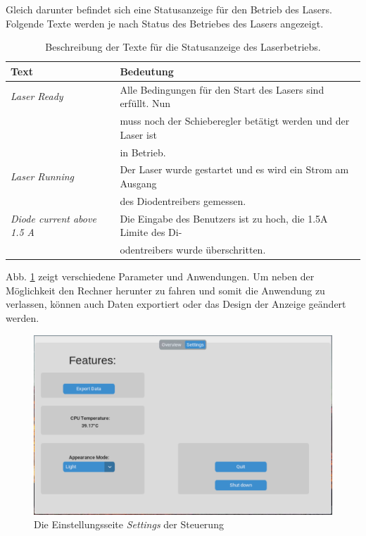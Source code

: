 Gleich darunter befindet sich eine Statusanzeige für den Betrieb des Lasers. Folgende Texte werden je nach Status des Betriebes des Lasers angezeigt.

\begin{table}[H]
    \centering
    \begin{tabular}{l|l}
        \textbf{Text}&                          \textbf{Bedeutung}\\
        \hline
         \textit{Laser Ready}&                  Alle Bedingungen für den Start des Lasers sind erfüllt. Nun\\
         &                                      muss noch der Schieberegler betätigt werden und der Laser ist\\
         &                                      in Betrieb.\\
         \textit{Laser Running}&                Der Laser wurde gestartet und es wird ein Strom am Ausgang\\
         &                                      des Diodentreibers gemessen.\\
         \textit{Diode current above 1.5 A}&    Die Eingabe des Benutzers ist zu hoch, die 1.5A Limite des Di-\\
         &                                      odentreibers wurde überschritten.                                
    \end{tabular}
    \caption{Beschreibung der Texte für die Statusanzeige des Laserbetriebs.}
    \label{tab:my_label}
\end{table}

Abb. \ref{fig:settings_sw} zeigt verschiedene Parameter und Anwendungen. Um neben der Möglichkeit den Rechner herunter zu fahren und somit die Anwendung zu verlassen, können auch Daten exportiert oder das Design der Anzeige geändert werden.

\begin{figure}[H]
    \centering
    \includegraphics[scale=0.3, trim={1mm 1mm 1mm 2mm}, clip]{98_images/window_settings_large_02.PNG}
    \caption{Die Einstellungsseite \textit{Settings} der Steuerung}
    \label{fig:settings_sw}
\end{figure}

